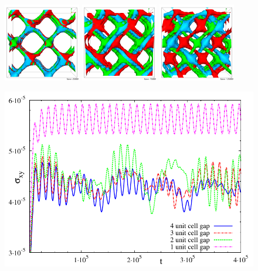 \documentclass[12pt]{iopart}
\begin{document}
\begin{figure}[h]
\centering
\includegraphics[width=0.3\textwidth]{disc_bp2_tk_scan_25k.png}
\includegraphics[width=0.3\textwidth]{disc_bp2_tk_scan_75k.png}
\includegraphics[width=0.3\textwidth]{disc_bp2_tk_scan_125k.png}
\caption{}
\label{fig2}
\end{figure}

\begin{figure}[h]
\centering
\includegraphics[width=\textwidth]{stress_bp2_fbc.pdf}
\caption{}
\label{fig3}
\end{figure}
\end{document}
